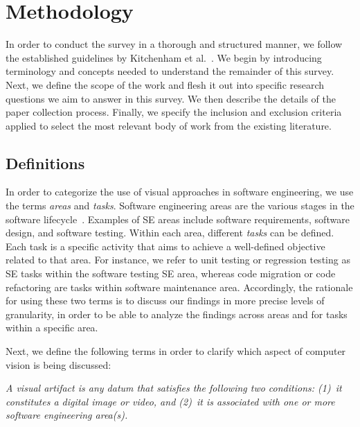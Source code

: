 \section{Methodology}\label{sec:methodology}

In order to conduct the survey in a thorough
and structured manner, we follow the established
guidelines by Kitchenham et al.~\cite{kitchenham2007guidelines}.
We begin by introducing terminology
and concepts needed to understand the remainder
of this survey.
Next, we define the scope of the work
and flesh it out into specific research questions
we aim to answer in this survey.
We then describe the details of the paper
collection process. 
Finally, we specify the inclusion and exclusion criteria
applied to select the most relevant body of work 
from the existing literature. 

\subsection{Definitions}\label{sec:defs}

In order to categorize
the use of visual approaches in software engineering, 
we use the terms \textit{areas} and \textit{tasks}.
Software engineering areas are the various stages in the software
lifecycle~\cite{IEEEComputerSociety:2014:GSE:2616205}.
Examples of SE areas include software requirements, software design,
and software testing.
Within each area, different \textit{tasks} can be defined.
Each task is a specific activity that aims to
achieve a well-defined objective related to that area.
For instance, we refer to unit testing or regression testing as
SE tasks within the software testing SE area,
whereas code migration or code refactoring are tasks within
software maintenance area.
Accordingly, the rationale for using these two terms is
to discuss our findings in more precise levels of granularity,
in order to be able to analyze the findings across areas and
for tasks within a specific area.

Next, we define the following terms in order to clarify
which aspect of computer vision is being discussed:

\begin{defn}
\textit{A visual artifact is any datum %
that satisfies the following two conditions: 
(1)~it constitutes a digital image or video, and
(2)~it is associated with one or more software engineering area(s).}
\end{defn}

